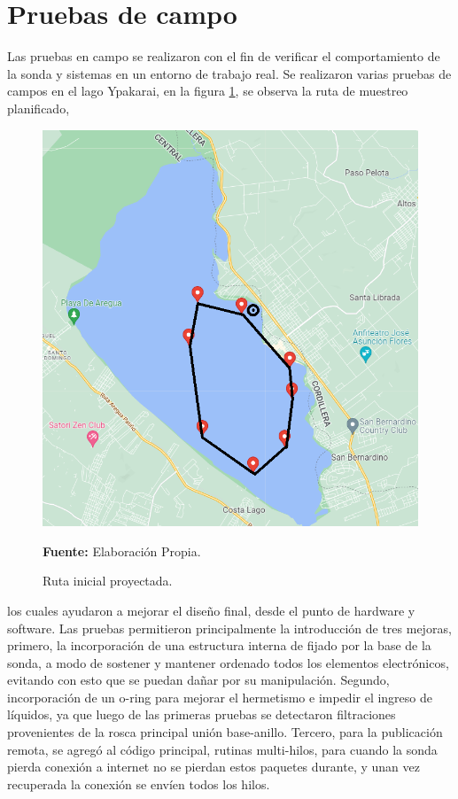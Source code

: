 \section{Pruebas de campo}
Las pruebas en campo se realizaron con el fin de verificar el comportamiento de la sonda y sistemas en un entorno de trabajo real. 
Se realizaron varias pruebas de campos en el lago Ypakarai, en la figura \ref{fig:lagoRutaInicial}, se observa la ruta de muestreo planificado, 
\begin{figure}[h]
        \centering
        \includegraphics[width=0.75\linewidth]{Imagenes/cap4/Recorrido_inicio.png}
        \caption {Ruta inicial proyectada. }{\textbf{Fuente:}
        Elaboraci\'on Propia. }
     \label{fig:lagoRutaInicial}
\end{figure}
los cuales ayudaron a mejorar el dise\~no final, desde el punto de hardware y software. Las pruebas permitieron principalmente la introducción de tres mejoras, primero, la incorporaci\'on de una estructura interna de fijado por la base de la sonda, a modo de sostener y mantener ordenado todos los elementos electr\'onicos, evitando con esto que se puedan da\~nar por su manipulaci\'on.
Segundo, incorporaci\'on de un o-ring para mejorar el hermetismo e impedir el ingreso de l\'iquidos, ya que luego de las primeras pruebas se detectaron filtraciones provenientes de la rosca principal uni\'on base-anillo.
Tercero, para la publicaci\'on remota, se agreg\'o al c\'odigo principal, rutinas multi-hilos, para cuando la sonda pierda conexi\'on a internet no se pierdan estos paquetes durante, y unan vez recuperada la conexi\'on se env\'ien todos los hilos. 

